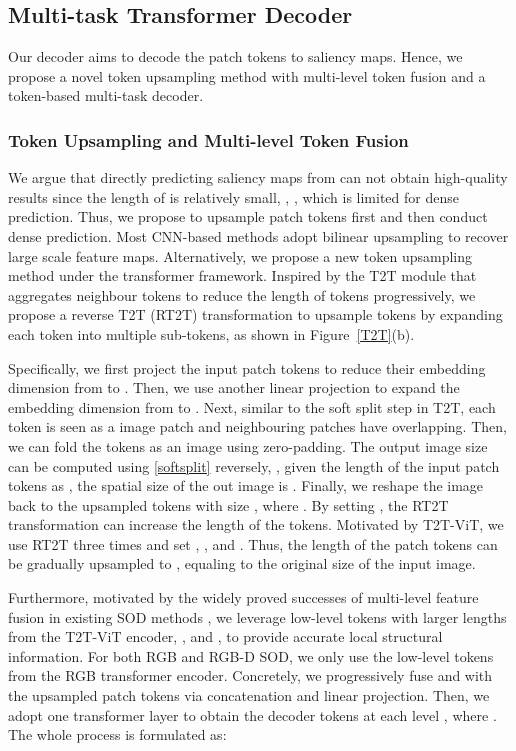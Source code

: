 \documentclass[10pt,twocolumn,letterpaper]{article}
\begin{document}
\subsection{Multi-task Transformer Decoder}
Our decoder aims to decode the patch tokens  to saliency maps. 
Hence,
we propose a novel token upsampling method with multi-level token fusion and a token-based multi-task decoder.




\subsubsection{Token Upsampling and Multi-level Token Fusion}
We argue that directly predicting saliency maps from  can not obtain high-quality results since the length of  is relatively small, \ie, , which is limited for dense prediction.
Thus, we propose to upsample patch tokens first and then conduct dense prediction.
Most CNN-based methods \cite{GateNet,zhao2019EGNet,liu2020S2MA,Fu2020JLDCF} adopt bilinear upsampling to recover large scale feature maps. 
Alternatively, we propose a new token upsampling method under the transformer framework. Inspired by the T2T module \cite{yuan2021tokens} that aggregates neighbour tokens to reduce the length of tokens progressively, we propose a reverse T2T (RT2T) transformation to upsample tokens by expanding each token into multiple sub-tokens, as shown in Figure~\ref{T2T}(b).

Specifically, we first project the input patch tokens to reduce their embedding dimension from  to .
Then, we use another linear projection to expand the embedding dimension from  to .
Next, similar to the soft split step in T2T, each token is seen as a  image patch and neighbouring patches have  overlapping. Then, we can fold the tokens as an image using  zero-padding. The output image size can be computed using \eqref{softsplit} reversely, \ie, given the length of the input patch tokens as , the spatial size of the out image is . Finally, we reshape the image back to the upsampled tokens with size , where .
By setting , the RT2T transformation can increase the length of the tokens. Motivated by T2T-ViT, we use RT2T three times and set , , and . Thus, the length of the patch tokens can be gradually upsampled to , equaling to the original size of the input image.

Furthermore, motivated by the widely proved successes of multi-level feature fusion in existing SOD methods \cite{hou2018dss,MINet-CVPR2020,GateNet,fan2020bbsnet,luo2020Cas-Gnn}, we leverage low-level tokens with larger lengths from the T2T-ViT encoder, \ie,  and , to provide accurate local structural information.
For both RGB and RGB-D SOD, we only use the low-level tokens from the RGB transformer encoder.
Concretely, we progressively fuse  and  with the upsampled patch tokens via concatenation and linear projection. Then, we adopt one transformer layer to obtain the decoder tokens  at each level , where . The whole process is formulated as:
\end{document}
